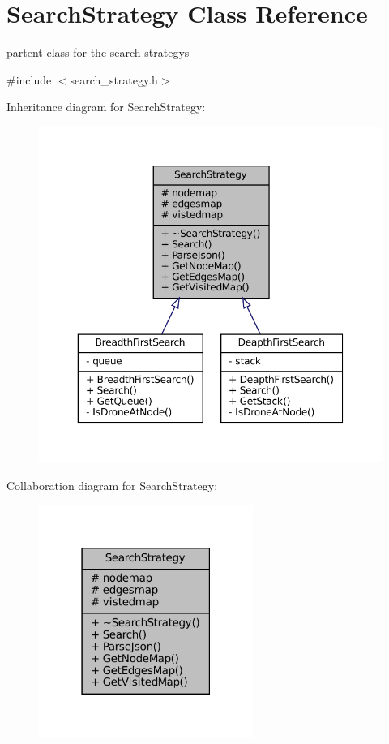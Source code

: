 \hypertarget{classSearchStrategy}{}\section{Search\+Strategy Class Reference}
\label{classSearchStrategy}


partent class for the search strategys  




{\ttfamily \#include $<$search\+\_\+strategy.\+h$>$}



Inheritance diagram for Search\+Strategy\+:\nopagebreak
\begin{figure}[H]
\begin{center}
\leavevmode
\includegraphics[width=350pt]{classSearchStrategy__inherit__graph}
\end{center}
\end{figure}


Collaboration diagram for Search\+Strategy\+:\nopagebreak
\begin{figure}[H]
\begin{center}
\leavevmode
\includegraphics[width=198pt]{classSearchStrategy__coll__graph}
\end{center}
\end{figure}
